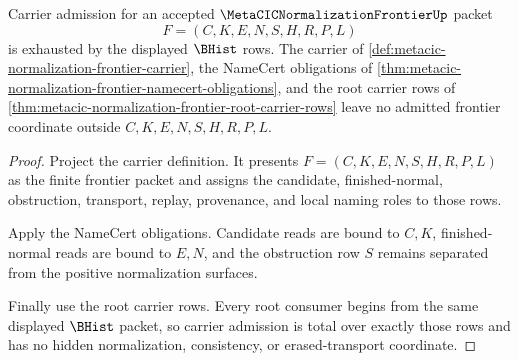 \begin{theorem}
\label{thm:metacic-normalization-frontier-obligation-closure-carrier-totality}
Carrier admission for an accepted $\MetaCICNormalizationFrontierUp$ packet
$$
F=(C,K,E,N,S,H,R,P,L)
$$
is exhausted by the displayed $\BHist$ rows. The carrier of \autoref{def:metacic-normalization-frontier-carrier}, the NameCert obligations of \autoref{thm:metacic-normalization-frontier-namecert-obligations}, and the root carrier rows of \autoref{thm:metacic-normalization-frontier-root-carrier-rows} leave no admitted frontier coordinate outside $C,K,E,N,S,H,R,P,L$.
\end{theorem}
\begin{proof}
Project the carrier definition. It presents $F=(C,K,E,N,S,H,R,P,L)$ as the finite frontier packet and assigns the candidate, finished-normal, obstruction, transport, replay, provenance, and local naming roles to those rows.

Apply the NameCert obligations. Candidate reads are bound to $C,K$, finished-normal reads are bound to $E,N$, and the obstruction row $S$ remains separated from the positive normalization surfaces.

Finally use the root carrier rows. Every root consumer begins from the same displayed $\BHist$ packet, so carrier admission is total over exactly those rows and has no hidden normalization, consistency, or erased-transport coordinate.
\end{proof}

